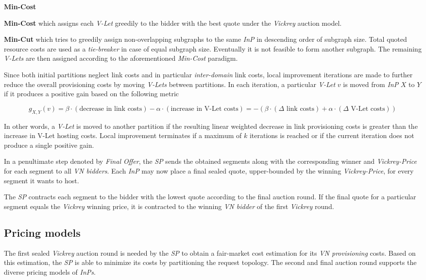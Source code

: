\documentclass[prodmode,acmtomccap]{acmlarge}
\begin{document}
\begin{describe}{{\bfseries Min-Cost\/}}
	\item[\bfseries Min-Cost] which assigns each \emph{V-Let} greedily to the bidder with the best quote under the \emph{Vickrey} auction model.
	\item[\bfseries Min-Cut] which tries to greedily assign non-overlapping subgraphs to the same \emph{InP} in descending order of subgraph size. Total quoted resource costs are used as a \emph{tie-breaker}
		in case of equal subgraph size. Eventually it is not feasible to form another subgraph. The remaining \emph{V-Lets} are then assigned according to the aforementioned \emph{Min-Cost} paradigm.
\end{describe}

Since both initial partitions neglect link costs and in particular \emph{inter-domain} link costs, local improvement iterations are made to further reduce the overall provisioning costs by moving
\emph{V-Lets} between partitions. In each iteration, a particular \emph{V-Let} $v$ is moved from \emph{InP} $X$ to $Y$ if it produces a positive gain based on the following metric

$$
	g_{X,Y}(v) = \beta \cdot (\text{decrease in link costs}) - \alpha \cdot (\text{increase in V-Let costs}) = -\left(\beta \cdot (\Delta \text{ link costs}) + \alpha \cdot (\Delta \text{ V-Let costs})\right) 
$$

In other words, a \emph{V-Let} is moved to another partition if the resulting linear weighted decrease in link provisioning costs is greater than the increase in V-Let hosting costs.
Local improvement terminates if a maximum of $k$ iterations is reached or if the current iteration does not produce a single positive gain.

In a penultimate step denoted by \emph{Final Offer}, the \emph{SP} sends the obtained segments along with the corresponding winner and \emph{Vickrey-Price} for each segment to all \emph{VN bidders}.
Each \emph{InP} may now place a final sealed quote, upper-bounded by the winning \emph{Vickrey-Price}, for every segment it wants to host.

The \emph{SP} contracts each segment to the bidder with the lowest quote according to the final auction round. If the final quote for a particular segment equals the \emph{Vickrey} winning price, it is contracted to
the winning \emph{VN bidder} of the first \emph{Vickrey} round.

\subsection{Pricing models}
The first sealed \emph{Vickrey} auction round is needed by the \emph{SP} to obtain a fair-market cost estimation for its \emph{VN provisioning} costs. 
Based on this estimation, the \emph{SP} is able to minimize its costs by partitioning the request topology.
The second and final auction round supports the diverse pricing models of \emph{InPs}.
\end{document}
